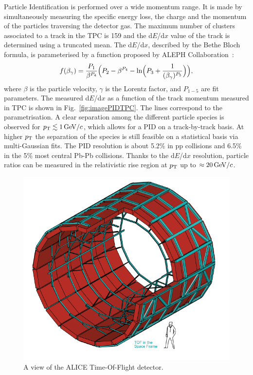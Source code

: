 Particle Identification is performed over a wide momentum range. It is made by 
simultaneously measuring the specific energy loss, the charge and the momentum of the 
particles traversing the detector gas. The maximum number of clusters associated to a track in the TPC 
is 159 and the d$E$/d$x$ value of the track is determined using a truncated mean.
The d$E$/d$x$, described by the Bethe Bloch formula,
is parameterised by a function proposed by ALEPH Collaboration~\cite{Rolandi:2008qla}:
\begin{equation}
f(\beta_\gamma) = \frac{P_1}{\beta^{P_4}} \Big ( P_2 - \beta^{P_4} - {\rm ln}\Big (   P_3 + \frac{1}{(\beta_\gamma)^{P_5}} \Big )   \Big ),
\end{equation}
where $\beta$ is the particle velocity, $\gamma$ is the Lorentz factor, and $P_{1-5}$ are fit parameters. 
The measured d$E$/d$x$ as a function of the track momentum measured in TPC is
shown in Fig.~\ref{fig:imagePIDTPC}. The lines correspond to the parametrisation. 
A clear separation among the different particle species
is observed for $p_{\rm T} \lesssim 1 \, \mathrm{GeV}/c$, which allows for a PID on a track-by-track basis. At higher $p_{\rm T}$ the separation of the species is still feasible 
on a statistical basis via multi-Gaussian fits. The PID resolution is about 5.2\% in 
pp collisions and 6.5\% in the 5\% most central Pb-Pb collisions. Thanks to the d$E$/d$x$ resolution, 
particle ratios can be measured in the relativistic rise region at $p_{\rm T}$ up to $\approx 20\, \mathrm{GeV}/c$.
 \begin{figure}[!h]
\centering
\includegraphics[width=.5\textwidth]{FigCap3/TOFCylinder.png}
\caption{A view of the ALICE Time-Of-Flight detector.}
\label{fig:imageTOF}
\end{figure}

